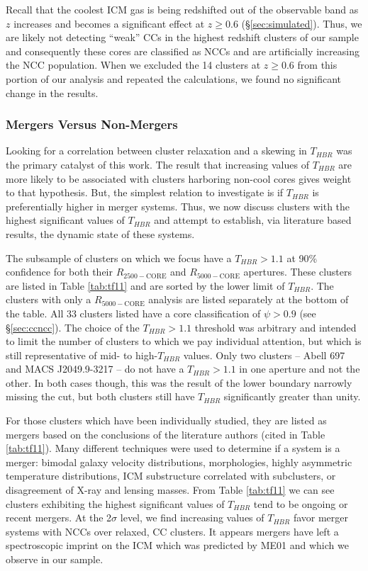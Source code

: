 \documentclass[12pt,preprint]{aastex}
\begin{document}
Recall that the coolest ICM gas is being redshifted out of the
observable band as $z$ increases and becomes a significant effect at
$z \geq 0.6$ (\S\ref{sec:simulated}). Thus, we are likely not detecting
``weak'' CCs in the highest redshift clusters of our sample and
consequently these cores are classified as NCCs and are artificially
increasing the NCC population. When we excluded the 14 clusters at $z
\geq 0.6$ from this portion of our analysis and repeated the
calculations, we found no significant change in the results.

\subsubsection{Mergers Versus Non-Mergers}\label{sec:merge}

Looking for a correlation between cluster relaxation and a skewing in
$T_{HBR}$ was the primary catalyst of this work. The result that
increasing values of $T_{HBR}$ are more likely to be associated with
clusters harboring non-cool cores gives weight to that hypothesis. But,
the simplest relation to investigate is if $T_{HBR}$ is preferentially
higher in merger systems. Thus, we now discuss clusters with the
highest significant values of $T_{HBR}$ and attempt to establish, via
literature based results, the dynamic state of these systems.

The subsample of clusters on which we focus have a $T_{HBR} > 1.1$ at
90\% confidence for both their $R_{2500-\mathrm{CORE}}$ and
$R_{5000-\mathrm{CORE}}$ apertures. These clusters are listed in Table
\ref{tab:tf11} and are sorted by the lower limit of $T_{HBR}$. The
clusters with only a $R_{5000-\mathrm{CORE}}$ analysis are listed
separately at the bottom of the table. All 33 clusters listed have a
core classification of $\psi > 0.9$ (see \S\ref{sec:ccncc}). The
choice of the $T_{HBR} > 1.1$ threshold was arbitrary and intended to
limit the number of clusters to which we pay individual attention, but
which is still representative of mid- to high-$T_{HBR}$ values. Only
two clusters -- Abell 697 and MACS J2049.9-3217 -- do not have a
$T_{HBR} > 1.1$ in one aperture and not the other. In both cases
though, this was the result of the lower boundary narrowly missing the
cut, but both clusters still have $T_{HBR}$ significantly greater than
unity.

For those clusters which have been individually studied, they are
listed as mergers based on the conclusions of the literature
authors (cited in Table \ref{tab:tf11}). Many different techniques
were used to determine if a system is a merger:  bimodal galaxy
velocity distributions, morphologies, highly asymmetric temperature
distributions, ICM substructure correlated with subclusters, or
disagreement of X-ray and lensing masses. From Table \ref{tab:tf11} we
can see clusters exhibiting the highest significant values of
$T_{HBR}$ tend to be ongoing or recent mergers. At the 2$\sigma$
level, we find increasing values of $T_{HBR}$ favor merger systems
with NCCs over relaxed, CC clusters. It appears mergers have left a
spectroscopic imprint on the ICM which was predicted by ME01 and which
we observe in our sample.
\end{document}
